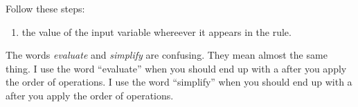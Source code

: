 \documentclass[fleqn,letterpaper,12pt,printwatermark=false]{memoir}
\begin{document}
\begin{myKeyConcepts}
    Follow these steps:
    \begin{enumerate}
        \item {} the value of the input variable whereever it appears in the rule.
    \end{enumerate}
    The words \emph{evaluate} and \emph{simplify} are confusing. 
    They mean almost the same thing.
    I use the word ``evaluate'' when you should end up with a  after you apply the order of operations.
    I use the word ``simplify'' when you should end up with a  after you apply the order of operations.
\end{myKeyConcepts}




  
\end{document}
